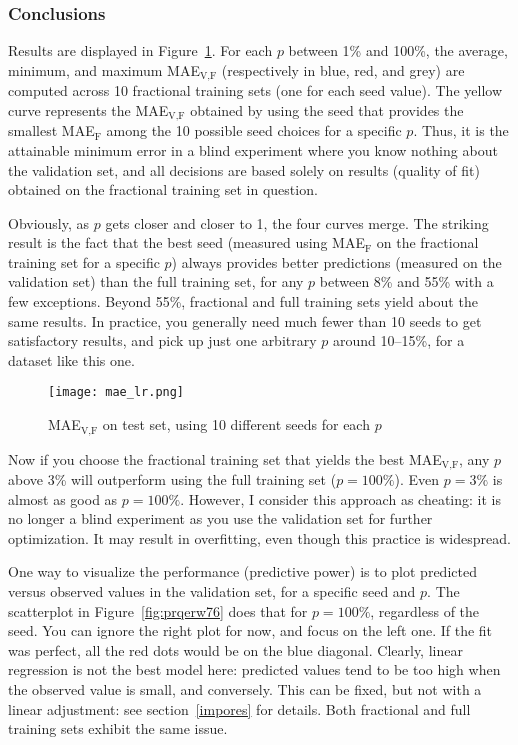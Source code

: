 \documentclass[oneside,10pt]{book}
\begin{document}
\subsubsection{Conclusions}

Results are displayed in Figure~\ref{fig:prqerw75}. For each $p$ between 1\% and 100\%, the average, minimum, and maximum   MAE$_{\text{V,F}}$ (respectively in blue, red, and grey) are 
 computed across 10 fractional training sets (one for each seed value).  The yellow curve represents the MAE$_{\text{V,F}}$ obtained
 by using the seed that provides the smallest MAE$_\text{F}$ among the 10 possible seed choices for a specific $p$. Thus, it 
 is the attainable minimum error in a blind experiment where you know nothing about the validation set, and all decisions are based solely 
 on results (quality of fit) obtained on the fractional training set in question. 

Obviously, as $p$ gets closer and closer to 1, the four curves merge. The striking  result is the fact that the best seed (measured using
  MAE$_\text{F}$ on the fractional training set for a specific $p$) always provides better predictions (measured on the validation set) than the full training set, for any $p$ between
 8\% and 55\% with a few exceptions. Beyond 55\%, fractional and full training sets yield about the same results. In practice, you 
generally need much fewer than 10 seeds to get satisfactory results, and pick up just one arbitrary $p$ around 10--15\%,  for a dataset like this one.

\begin{figure}[H]
\centering
\texttt{[image: mae\_lr.png]}  
\caption{MAE$_\text{V,F}$ on test set, using 10 different seeds for each $p$}
\label{fig:prqerw75}
\end{figure}

Now if you choose the fractional training set that yields the best MAE$_{\text{V,F}}$, any $p$ above 3\% will
 outperform using the full training set ($p=100\%$). Even $p=3\%$ is almost as good as $p=100\%$. However, I consider this approach as cheating: it is no longer a blind experiment as you use the validation set for further optimization. It may result in overfitting, even though this practice is widespread. 

One way to visualize the performance (predictive power) is to plot predicted versus observed values in the validation set, for a specific seed and $p$. The scatterplot in Figure~\ref{fig:prqerw76} does that for $p=100\%$, regardless of the seed. You can ignore the right plot for now, and focus on the left one. If the fit was perfect, all the red dots would be on the blue diagonal. Clearly, linear regression is not the best model here: predicted values tend to be too high when the observed value is small, and conversely. This can be fixed, but not with a linear adjustment: see section~\ref{impores} for details. Both fractional and full training sets exhibit the same issue. 
\end{document}
